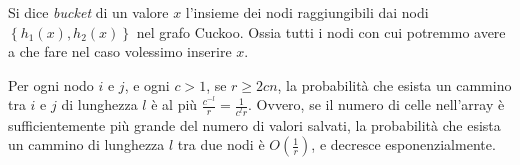 \begin{definition*}[Bucket]
    Si dice \emph{bucket} di un valore $x$ l'insieme dei nodi raggiungibili dai
    nodi $\left\{h_1(x), h_2(x)\right\}$ nel grafo Cuckoo. Ossia tutti i nodi
    con cui potremmo avere a che fare nel caso volessimo inserire $x$.
\end{definition*}

\begin{lemma}
    Per ogni nodo $i$ e $j$, e ogni $c > 1$, se $r \ge 2cn$, la probabilità che
    esista un cammino tra $i$ e $j$ di lunghezza $l$ è al più $\frac{c^{-l}}{r}
    = \frac{1}{c^lr}$. Ovvero, se il numero di celle nell'array è
    sufficientemente più grande del numero di valori salvati, la probabilità
    che esista un cammino di lunghezza $l$ tra due nodi è $O(\frac{1}{r})$, e
    decresce esponenzialmente.
\end{lemma}

